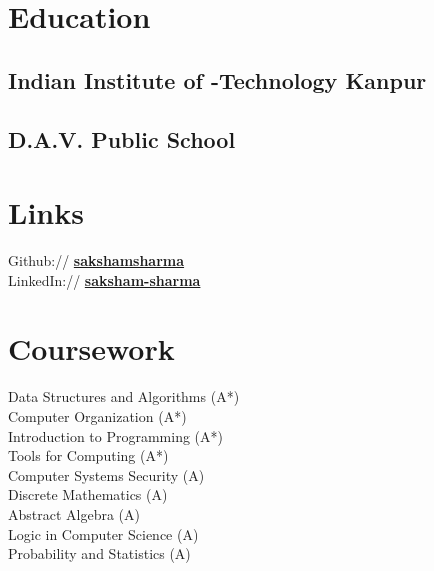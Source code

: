 \documentclass[a4paper]{deedy-resume} %
\begin{document}
\lastupdated


\begin{minipage}[t]{0.33\textwidth} %

\section{Education} 

\subsection{Indian Institute of -\newline Technology Kanpur}


\sectionspace

\subsection{D.A.V. Public School}

\sectionspace

\section{Links} 

Github:// \href{https://github.com/sakshamsharma}{\bf sakshamsharma} \\
LinkedIn:// \href{https://www.linkedin.com/in/sakshamsharma}{\bf saksham-sharma} \\

\sectionspace

\section{Coursework}
Data Structures and Algorithms (A*)\\
Computer Organization (A*)\\
Introduction to Programming (A*)\\
Tools for Computing (A*)\\
Computer Systems Security (A)\\
Discrete Mathematics (A)\\
Abstract Algebra (A)\\
Logic in Computer Science (A)\\
Probability and Statistics (A)\\


\end{minipage}
\end{document}
